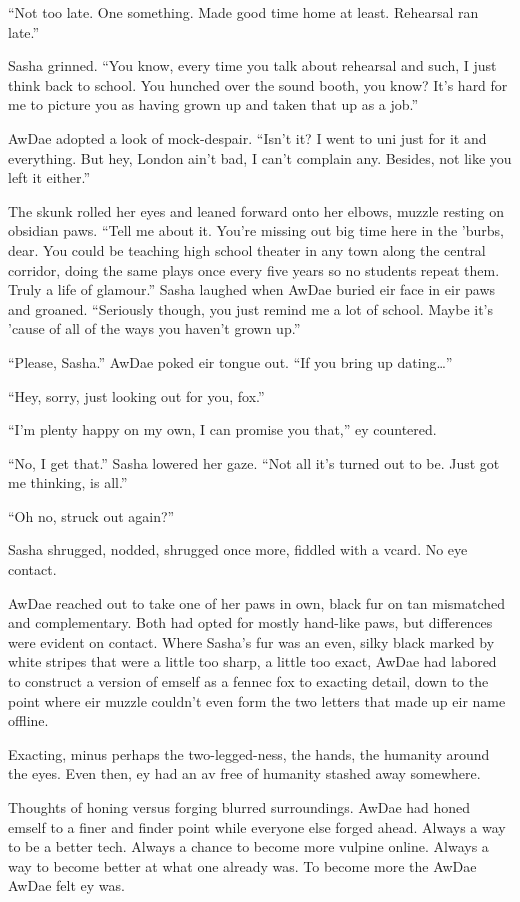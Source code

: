 ``Not too late. One something. Made good time home at least. Rehearsal ran late.''

Sasha grinned. ``You know, every time you talk about rehearsal and such, I just think back to school. You hunched over the sound booth, you know? It's hard for me to picture you as having grown up and taken that up as a job.''

AwDae adopted a look of mock-despair. ``Isn't it? I went to uni just for it and everything. But hey, London ain't bad, I can't complain any. Besides, not like you left it either.''

The skunk rolled her eyes and leaned forward onto her elbows, muzzle resting on obsidian paws. ``Tell me about it. You're missing out big time here in the 'burbs, dear. You could be teaching high school theater in any town along the central corridor, doing the same plays once every five years so no students repeat them. Truly a life of glamour.'' Sasha laughed when AwDae buried eir face in eir paws and groaned. ``Seriously though, you just remind me a lot of school. Maybe it's 'cause of all of the ways you haven't grown up.''

``Please, Sasha.'' AwDae poked eir tongue out. ``If you bring up dating\ldots{}''

``Hey, sorry, just looking out for you, fox.''

``I'm plenty happy on my own, I can promise you that,'' ey countered.

``No, I get that.'' Sasha lowered her gaze. ``Not all it's turned out to be. Just got me thinking, is all.''

``Oh no, struck out again?''

Sasha shrugged, nodded, shrugged once more, fiddled with a vcard. No eye contact.

AwDae reached out to take one of her paws in own, black fur on tan mismatched and complementary. Both had opted for mostly hand-like paws, but differences were evident on contact. Where Sasha's fur was an even, silky black marked by white stripes that were a little too sharp, a little too exact, AwDae had labored to construct a version of emself as a fennec fox to exacting detail, down to the point where eir muzzle couldn't even form the two letters that made up eir name offline.

Exacting, minus perhaps the two-legged-ness, the hands, the humanity around the eyes. Even then, ey had an av free of humanity stashed away somewhere.

Thoughts of honing versus forging blurred surroundings. AwDae had honed emself to a finer and finder point while everyone else forged ahead. Always a way to be a better tech. Always a chance to become more vulpine online. Always a way to become better at what one already was. To become more the AwDae AwDae felt ey was.

